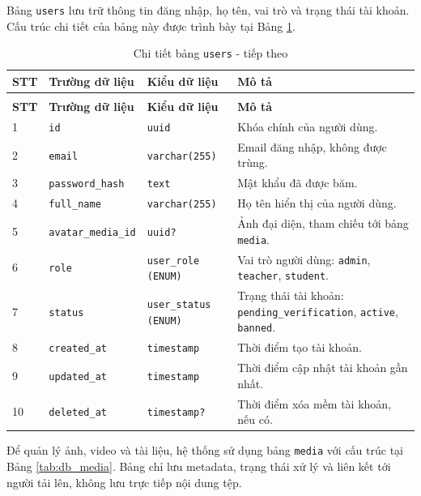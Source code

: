 \documentclass[../DoAn.tex]{subfiles}
\begin{document}
{\small
Bảng \texttt{users} lưu trữ thông tin đăng nhập, họ tên, vai trò và trạng thái tài khoản. Cấu trúc chi tiết của bảng này được trình bày tại Bảng \ref{tab:db_users}.

\begin{longtable}{|p{}|p{}|p{}|p{}|}
\caption{Chi tiết bảng \texttt{users}}
\label{tab:db_users}\\
\hline
\textbf{STT} & \textbf{Trường dữ liệu} & \textbf{Kiểu dữ liệu} & \textbf{Mô tả} \\ \hline
\endfirsthead
\caption[]{Chi tiết bảng \texttt{users} - tiếp theo}\\
\hline
\textbf{STT} & \textbf{Trường dữ liệu} & \textbf{Kiểu dữ liệu} & \textbf{Mô tả} \\ \hline
\endhead
1 & \texttt{id} & \texttt{uuid} & Khóa chính của người dùng. \\ \hline
2 & \texttt{email} & \texttt{varchar(255)} & Email đăng nhập, không được trùng. \\ \hline
3 & \texttt{password\_hash} & \texttt{text} & Mật khẩu đã được băm. \\ \hline
4 & \texttt{full\_name} & \texttt{varchar(255)} & Họ tên hiển thị của người dùng. \\ \hline
5 & \texttt{avatar\_media\_id} & \texttt{uuid?} & Ảnh đại diện, tham chiếu tới bảng \texttt{media}. \\ \hline
6 & \texttt{role} & \texttt{user\_role (ENUM)} & Vai trò người dùng: \texttt{admin}, \texttt{teacher}, \texttt{student}. \\ \hline
7 & \texttt{status} & \texttt{user\_status (ENUM)} & Trạng thái tài khoản: \texttt{pending\_verification}, \texttt{active}, \texttt{banned}. \\ \hline
8 & \texttt{created\_at} & \texttt{timestamp} & Thời điểm tạo tài khoản. \\ \hline
9 & \texttt{updated\_at} & \texttt{timestamp} & Thời điểm cập nhật tài khoản gần nhất. \\ \hline
10 & \texttt{deleted\_at} & \texttt{timestamp?} & Thời điểm xóa mềm tài khoản, nếu có. \\ \hline
\end{longtable}

Để quản lý ảnh, video và tài liệu, hệ thống sử dụng bảng \texttt{media} với cấu trúc tại Bảng \ref{tab:db_media}. Bảng chỉ lưu metadata, trạng thái xử lý và liên kết tới người tải lên, không lưu trực tiếp nội dung tệp.

}
\end{document}
